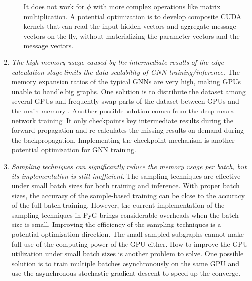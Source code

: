 \begin{enumerate}
\begin{itemize}
                    It does not work for $\phi$ with more complex operations like matrix multiplication.
                    A potential optimization is to develop composite CUDA kernels that can read the input hidden vectors and aggregate message vectors on the fly, without materializing the parameter vectors and the message vectors.
         \end{itemize}
    \item \emph{The high memory usage caused by the intermediate results of the edge calculation stage limits the data scalability of GNN training/inference.}
          The memory expansion ratios of the typical GNNs are very high, making GPUs unable to handle big graphs.
          One solution is to distribute the dataset among several GPUs and frequently swap parts of the dataset between GPUs and the main memory \cite{ma2019_neugraph}.
          Another possible solution \cite{chen2016_training_deep} comes from the deep neural network training. %
          It only checkpoints key intermediate results during the forward propagation and re-calculates the missing results on demand during the backpropagation.
          Implementing the checkpoint mechanism is another potential optimization for GNN training.

    \item \emph{Sampling techniques can significantly reduce the memory usage per batch, but its implementation is still inefficient}.
          The sampling techniques are effective under small batch sizes for both training and inference.
          With proper batch sizes, the accuracy of the sample-based training can be close to the accuracy of the full-batch training.
          However, the current implementation of the sampling techniques in PyG brings considerable overheads when the batch size is small.
          Improving the efficiency of the sampling techniques is a potential optimization direction.
          The small sampled subgraphs cannot make full use of the computing power of the GPU either.
          How to improve the GPU utilization under small batch sizes is another problem to solve.
          One possible solution is to train multiple batches asynchronously on the same GPU and use the asynchronous stochastic gradient descent to speed up the converge.
\end{enumerate}
